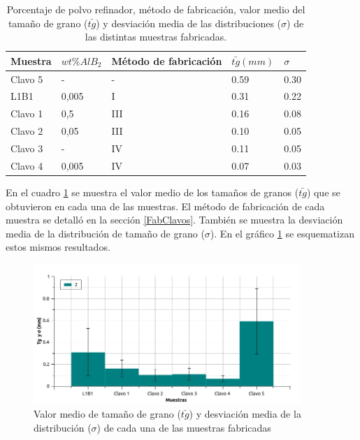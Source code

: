 \documentclass[a4paper,12pt,fleqn,twoside,openany]{book}
\begin{document}
\begin{table} 
\begin{center} 
\begin{tabular}{@{}lllll@{}} \toprule
Muestra & $wt \% AlB_2$ & Método de fabricación & $\bar{tg} (mm)$ & $\sigma$ \\ \midrule
 Clavo 5 &  -     & -   & 0.59  & 0.30   \\
 L1B1    &  0,005 & I   & 0.31 & 0.22  \\
 Clavo 1 &  0,5   & III & 0.16 & 0.08   \\
 Clavo 2 &  0,05  & III & 0.10 & 0.05   \\
 Clavo 3 &  -     & IV  & 0.11 & 0.05   \\
 Clavo 4 &  0,005 & IV  & 0.07 & 0.03   \\
\bottomrule
\end{tabular}
\caption{Porcentaje de polvo refinador, método de fabricación, valor medio del tamaño de grano ($\bar{tg}$) y desviación media de las distribuciones ($\sigma$) de las distintas muestras fabricadas.}
\label{tab:ResClavos}
\end{center}
\end{table}


En el cuadro \ref{tab:ResClavos} se muestra el valor medio de los tamaños de granos ($\bar{tg}$) que se obtuvieron en cada una de las muestras. El método de fabricación de cada muestra se detalló en la sección \ref{FabClavos}. También se muestra la desviación media de la distribución de tamaño de grano ($\sigma$). En el gráfico \ref{fig:tamaños} se esquematizan estos mismos resultados.

 \begin{figure}[h]
 \centering
 \includegraphics[width=0.9\textwidth]{Img/Resultados/clavos/TamGranos.jpg}
 \caption{Valor medio de tamaño de grano ($\bar{tg}$) y desviación media de la distribución ($\sigma$) de cada una de las muestras fabricadas} 
 \label{fig:tamaños}
 \end{figure}
\end{document}
